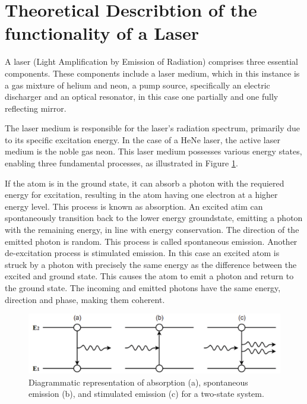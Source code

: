 \section{Theoretical Describtion of the functionality of a Laser}
\label{sec:theory}

A laser (Light Amplification by Emission of Radiation) comprises
three essential components. These components include a laser medium, 
which in this instance is a gas mixture of helium and neon, a pump
source, specifically an electric discharger and an optical resonator, 
in this case one partially and one fully reflecting mirror.

The laser medium is responsible for the laser's radiation spectrum, 
primarily due to its specific excitation energy. In the case 
of a HeNe laser, the active laser medium is the noble gas neon. 
This laser medium possesses various energy states, enabling three 
fundamental processes, as illustrated in Figure \ref{fig:emission}.

If the atom is in the ground state, it can absorb a photon with
the requiered energy for excitation, resulting in the atom having 
one electron at a higher energy level. This process is known as 
absorption. An excited atim can spontaneously transition back 
to the lower energy groundstate, emitting a photon with the remaining 
energy, in line with energy conservation. The direction of the emitted
photon is random. This process is called spontaneous emission.
Another de-excitation process is stimulated emission. In this case
an excited atom is struck by a photon with precisely the same 
energy as the difference between the excited and ground state. 
This causes the atom to emit a photon and return to the ground state.
The incoming and emitted photons have the same energy, direction and 
phase, making them coherent.

\begin{figure}
    \centering
    \includegraphics[width=0.8\linewidth]{pictures/emission.png} %
    \caption{Diagrammatic representation of absorption (a), spontaneous emission (b), and stimulated emission (c) for a two-state system. \cite{emission}}
    \label{fig:emission}
\end{figure}

